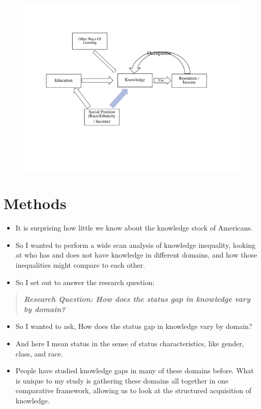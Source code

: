 \documentclass[]{article}
\begin{document}
    \begin{figure}[htb]
      \begin{center}
        \includegraphics[width=0.7\linewidth]{"Theoretical Model Drawing"}
      \end{center}
    \end{figure}

\newpage

\section{Methods}\label{methods}



\begin{itemize}
   \item{It is surprising how little we know about the knowledge stock of Americans.}
   \item{So I wanted to perform a wide scan analysis of knowledge inequality, looking at who has and does not have knowledge in different domains, and how those inequalities might compare to each other.}
  \item{So I set out to answer the research question:}
\end{itemize}

\begin{quote}
  \emph{\textbf{Research Question: How does the status gap in knowledge vary by domain?}}
\end{quote}

\vspace{5mm}

\begin{itemize}
  \item{So I wanted to ask, How does the status gap in knowledge vary by domain?}
  \item{And here I mean status in the sense of status characteristics, like gender, class, and race.}
  \item{People have studied knowledge gaps in many of these domains before. What is unique to my study is gathering these domains all together in one comparative framework, allowing us to look at the structured acquisition of knowledge.}
\end{itemize}
\end{document}
